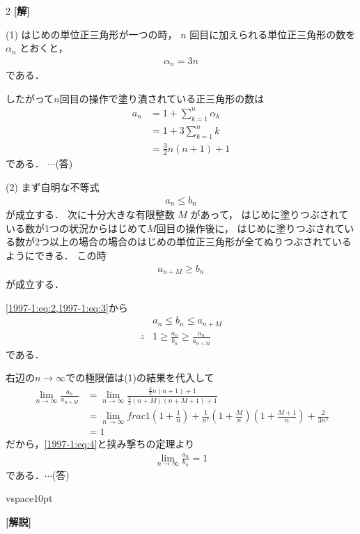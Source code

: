 \documentclass[../../../../main.tex]{subfiles}
\begin{document}
\setcounter{equation}{0}
\begin{oframed}
    
\end{oframed}
\setlength{\columnseprule}{0.4pt}
\begin{multicols}{2}
    {\bf[解]}

    (1)
    はじめの単位正三角形が一つの時，
    $n$ 回目に加えられる単位正三角形の数を $\alpha_n$ とおくと，
    \begin{align}
        \alpha_n = 3n \label{1997-1:eq:1}
    \end{align}
    である．

    したがって$n$回目の操作で塗り潰されている正三角形の数は
    \begin{align*}
        a_n
         & = 1 + \sum_{k=1}^{n} \alpha_{k} \\
         & = 1 + 3 \sum_{k=1}^{n} k        \\
         & = \frac{3}{2}n(n+1) + 1
    \end{align*}
    である．    $\cdots$(答)
    \vspace{10pt}

    (2)
    まず自明な不等式
    \begin{align}
        a_n \le b_n \label{1997-1:eq:2}
    \end{align}
    が成立する．
    次に十分大きな有限整数 $M$ があって，
    はじめに塗りつぶされている数が1つの状況からはじめて$M$回目の操作後に，
    はじめに塗りつぶされている数が2つ以上の場合の場合のはじめの単位正三角形が全てぬりつぶされているようにできる．
    この時
    \begin{align}
        a_{n+M} \ge b_n \label{1997-1:eq:3}
    \end{align}
    が成立する．

    \cref{1997-1:eq:2,1997-1:eq:3}から
    \begin{align}
         & a_n \le b_n \le a_{n+M}                                           \\
        \therefore
         & 1 \ge \frac{a_n}{b_n} \ge \frac{a_n}{a_{n+M}} \label{1997-1:eq:4}
    \end{align}
    である．

    右辺の$n\to\infty$での極限値は(1)の結果を代入して
    \begin{align*}
        \lim_{n\to\infty} \frac{a_n}{a_{n+M}}
         & = \lim_{n\to\infty} \frac{\frac{3}{2}n(n+1)+1}{\frac{3}{2}(n+M)(n+M+1)+1}                                 \\
         & = \lim_{n\to\infty} frac{1(1+\frac{1}{n})+\frac{1}{n^2}}{(1+\frac{M}{n})(1+\frac{M+1}{n})+\frac{2}{3n^2}} \\
         & = 1
    \end{align*}
    だから，\cref{1997-1:eq:4}と挟み撃ちの定理より
    \begin{align*}
        \lim_{n\to\infty} \frac{a_n}{b_n} = 1
    \end{align*}
    である．$\cdots$(答)

    vspace{10pt}

        {\bf[解説]}

    \newpage
\end{multicols}
\end{document}
